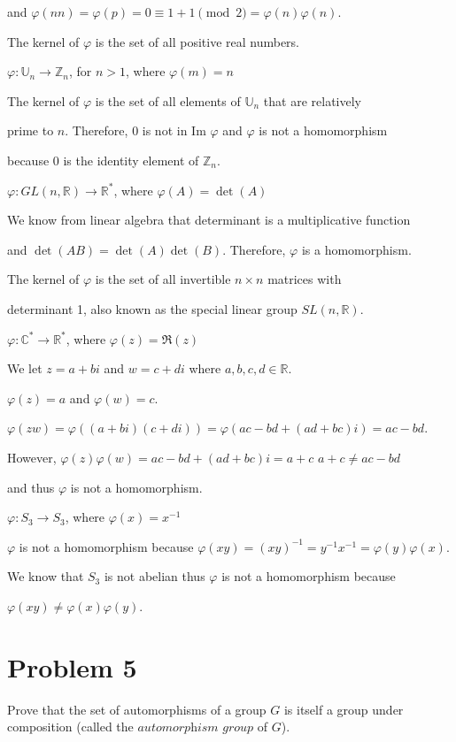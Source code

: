 \documentclass{article}
\theoremstyle{plain} %
\theoremstyle{definition} %
\begin{document}
and $\varphi(nn) = \varphi(p) = 0 \equiv 1 + 1 \pmod{2} = \varphi(n)\varphi(n)$.

The kernel of $\varphi$ is the set of all positive real numbers.

\noindent{} $\varphi : \mathbb{U}_n \to \mathbb{Z}_n$, for $n > 1$, where $\varphi(m) = n$ 

The kernel of $\varphi$ is the set of all elements of $\mathbb{U}_n$ that are relatively

prime to $n$. Therefore, 0 is not in Im $\varphi$ and $\varphi$ is not a homomorphism 

because 0 is the identity element of $\mathbb{Z}_n$.

\noindent{} $\varphi : GL(n, \mathbb{R}) \to \mathbb{R}^*$, where $\varphi(A) = \det(A)$

We know from linear algebra that determinant is a multiplicative function

and $\det(AB) = \det(A)\det(B)$. Therefore, $\varphi$ is a homomorphism.

The kernel of $\varphi$ is the set of all invertible $n \times n$ matrices with 

determinant 1, also known as the special linear group $SL(n, \mathbb{R})$.

\noindent{} $\varphi : \mathbb{C}^* \to \mathbb{R}^*$, where $\varphi(z) = \mathfrak{R}(z)$

We let $z = a + bi$ and $w = c + di$ where $a,b,c,d \in \mathbb{R}$.

$\varphi(z) = a$ and $\varphi(w) = c$.

$\varphi(zw) = \varphi((a+bi)(c+di)) = \varphi(ac-bd + (ad+bc)i) = ac-bd$.

However, $\varphi(z)\varphi(w) = ac-bd + (ad+bc)i = a+c$
$a+c \neq ac-bd$ 

and thus $\varphi$ is not a homomorphism.

\noindent{} $\varphi : S_3 \to S_3$, where $\varphi(x) = x^{-1}$

$\varphi$ is not a homomorphism because $\varphi(xy) = (xy)^{-1} = y^{-1}x^{-1} = \varphi(y)\varphi(x)$.

We know that $S_3$ is not abelian thus $\varphi$ is not a homomorphism because 

$\varphi(xy) \neq \varphi(x)\varphi(y)$.

\section*{Problem 5}    
\noindent{} Prove that the set of automorphisms of a group $G$ is itself a group
under composition (called the $\textit{automorphism group}$ of $G$).
\end{document}
